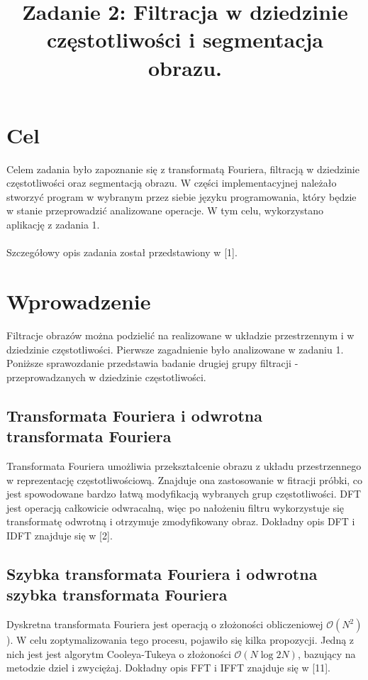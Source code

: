 \documentclass{classrep}
\author{
  \studentinfo{Jakub Antosik}{206788} \and
  \studentinfo{Andrzej Lisowski}{206807} 
}
\title{Zadanie 2: Filtracja w dziedzinie częstotliwości i segmentacja obrazu.}
\begin{document}
\maketitle

\section{Cel}
Celem zadania było zapoznanie się z transformatą Fouriera, filtracją w dziedzinie częstotliwości oraz segmentacją obrazu. W części implementacyjnej należało stworzyć program w wybranym przez siebie języku programowania, który będzie w stanie przeprowadzić analizowane operacje. W tym celu, wykorzystano aplikację z zadania 1.\\
\\
\indent
Szczegółowy opis zadania został przedstawiony w [1].

\section{Wprowadzenie}
Filtracje obrazów można podzielić na realizowane w układzie przestrzennym i w dziedzinie częstotliwości. Pierwsze zagadnienie było analizowane w zadaniu 1. Poniższe sprawozdanie przedstawia badanie drugiej grupy filtracji - przeprowadzanych w dziedzinie częstotliwości.  

\subsection{Transformata Fouriera i odwrotna transformata Fouriera}
Transformata Fouriera umożliwia przekształcenie obrazu z układu przestrzennego w reprezentację częstotliwościową. Znajduje ona zastosowanie w fitracji próbki, co jest spowodowane bardzo łatwą modyfikacją wybranych grup częstotliwości. DFT jest operacją całkowicie odwracalną, więc po nałożeniu filtru wykorzystuje się transformatę odwrotną i otrzymuje zmodyfikowany obraz. Dokładny opis DFT i IDFT znajduje się w [2].

\subsection{Szybka transformata Fouriera i odwrotna szybka transformata Fouriera}
Dyskretna transformata Fouriera jest operacją o złożoności obliczeniowej $\mathcal{O}(N^{2})$). W celu zoptymalizowania tego procesu, pojawiło się kilka propozycji. Jedną z nich jest jest algorytm Cooleya-Tukeya o złożoności $\mathcal{O}(N\log{2}N)$, bazujący na metodzie dziel i zwyciężaj. Dokładny opis FFT i IFFT znajduje się w [11].
\end{document}
